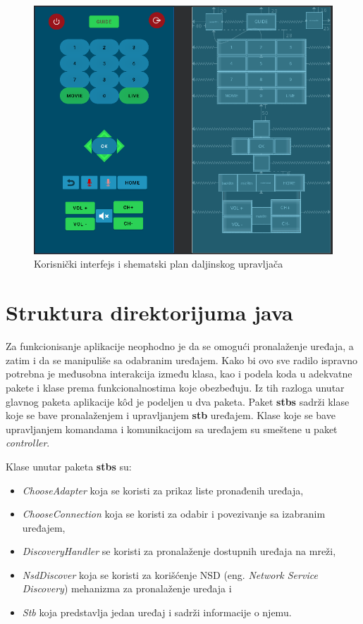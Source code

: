 \documentclass[implementacija.tex]{subfiles}
\begin{document}
\begin{figure}[!ht]
  \centering
  \includegraphics[width=\textwidth]{Implementacija/snimci_ekrana/remote_control_scene.png}
  \caption{Korisnički interfejs i shematski plan daljinskog upravljača}
  \label{fig:remoteScena}
\end{figure}


\section{Struktura direktorijuma java}
Za funkcionisanje aplikacije neophodno je da se omogući pronalaženje uređaja, a zatim i da se manipuliše sa odabranim uređajem. Kako bi ovo sve radilo ispravno potrebna je međusobna interakcija između klasa, kao i podela koda u adekvatne pakete i klase prema funkcionalnostima koje obezbeđuju. Iz tih razloga unutar glavnog paketa aplikacije k\^{o}d je podeljen u dva paketa. Paket \textbf{stbs} sadrži klase koje se bave pronalaženjem i upravljanjem \textbf{stb} uređajem. Klase koje se bave upravljanjem komandama i komunikacijom sa uređajem su smeštene u paket \textit{controller}. 

Klase unutar paketa \textbf{stbs} su:
\begin{itemize}
\item \textit{ChooseAdapter} koja se koristi za prikaz liste pronađenih uređaja,
\item \textit{ChooseConnection} koja se koristi za odabir i povezivanje sa izabranim uređajem,
\item \textit{DiscoveryHandler} se koristi za pronalaženje dostupnih uređaja na mreži,
\item \textit{NsdDiscover} koja se koristi za korišćenje NSD (eng. \textit{Network Service Discovery}) mehanizma za pronalaženje uređaja i
\item \textit{Stb} koja predstavlja jedan uređaj i sadrži informacije o njemu.
\end{itemize}
\end{document}
